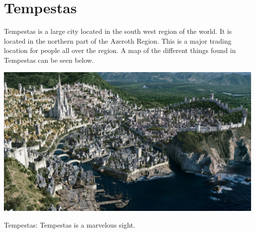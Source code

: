 \section{Tempestas}

Tempestas is a large city located in the south west region of the world. It is located in the northern part of the Azeroth Region. This is a major trading location for people all over the region. A map of the different things found in Tempestas can be seen below.

\begin{center}
	\includegraphics[width=\linewidth]{img/WoW/1200px-StormwindPanorama.jpg}
	
	{Tempestas: Tempestas is a marvelous sight.}
\end{center}


